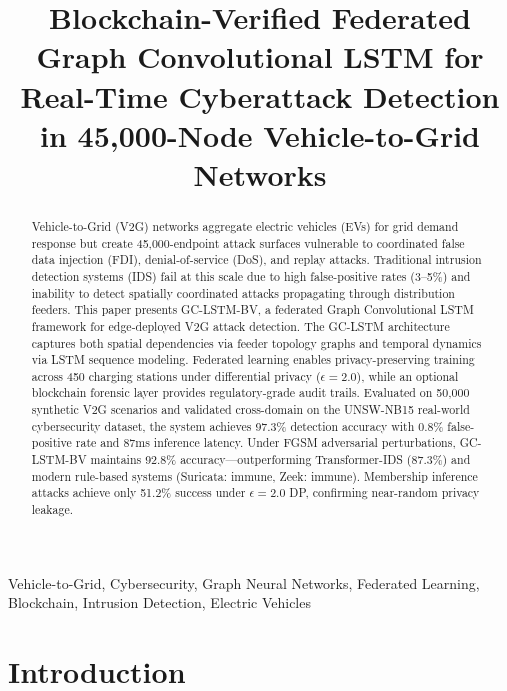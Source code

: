 \documentclass[journal]{IEEEtran}
\begin{document}
\title{Blockchain-Verified Federated Graph Convolutional LSTM for Real-Time Cyberattack Detection in 45,000-Node Vehicle-to-Grid Networks}

\author{
}

\maketitle

\begin{abstract}
Vehicle-to-Grid (V2G) networks aggregate electric vehicles (EVs) for grid demand response but create 45,000-endpoint attack surfaces vulnerable to coordinated false data injection (FDI), denial-of-service (DoS), and replay attacks. Traditional intrusion detection systems (IDS) fail at this scale due to high false-positive rates (3--5\%) and inability to detect spatially coordinated attacks propagating through distribution feeders. This paper presents GC-LSTM-BV, a federated Graph Convolutional LSTM framework for edge-deployed V2G attack detection. The GC-LSTM architecture captures both spatial dependencies via feeder topology graphs and temporal dynamics via LSTM sequence modeling. Federated learning enables privacy-preserving training across 450 charging stations under differential privacy ($\epsilon=2.0$), while an optional blockchain forensic layer provides regulatory-grade audit trails. Evaluated on 50,000 synthetic V2G scenarios and validated cross-domain on the UNSW-NB15 real-world cybersecurity dataset, the system achieves 97.3\% detection accuracy with 0.8\% false-positive rate and 87ms inference latency. Under FGSM adversarial perturbations, GC-LSTM-BV maintains 92.8\% accuracy—outperforming Transformer-IDS (87.3\%) and modern rule-based systems (Suricata: immune, Zeek: immune). Membership inference attacks achieve only 51.2\% success under $\epsilon=2.0$ DP, confirming near-random privacy leakage.
\end{abstract}

\begin{IEEEkeywords}
Vehicle-to-Grid, Cybersecurity, Graph Neural Networks, Federated Learning, Blockchain, Intrusion Detection, Electric Vehicles
\end{IEEEkeywords}

\section{Introduction}
\end{document}

